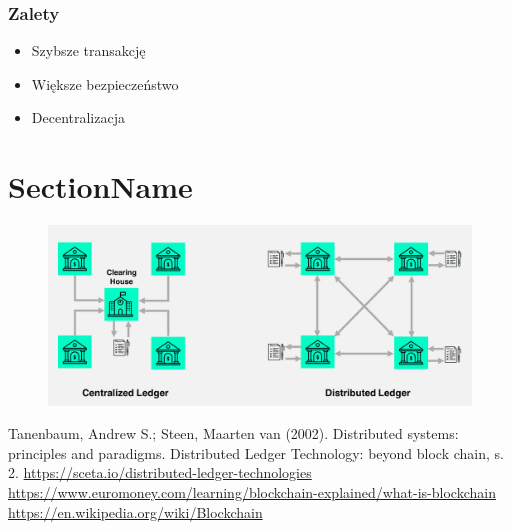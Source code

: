 \documentclass[12pt]{article}
\newenvironment{centerfig}
{\begin{figure}[H]\centering}
{\end{figure}}
\begin{document}
\subsubsection{Zalety}
\begin{itemize}
  \item Szybsze transakcję
  \item Większe bezpieczeństwo
  \item Decentralizacja
\end{itemize}

\section{SectionName}

\begin{centerfig}
  \includegraphics[width=\textwidth]{1.png}
\end{centerfig}


\begin{thebibliography}{9}
  Tanenbaum, Andrew S.; Steen, Maarten van (2002). Distributed systems: principles and paradigms.
  Distributed Ledger Technology: beyond block chain, s. 2.
  \url{https://sceta.io/distributed-ledger-technologies}
  \url{https://www.euromoney.com/learning/blockchain-explained/what-is-blockchain}
  \url{https://en.wikipedia.org/wiki/Blockchain}
\end{thebibliography}
\end{document}
